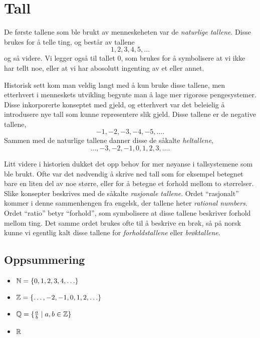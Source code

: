 

\section{Tall}

De første tallene som ble brukt av menneskeheten var de \emph{naturlige tallene}. 
Disse brukes for å telle ting, og består av tallene 
$$1, 2, 3, 4, 5, \ldots$$
og så videre.
Vi legger også til tallet $0$, som brukes for å symbolisere at vi ikke har tellt noe, eller at vi har abosolutt ingenting av et eller annet. 

Historisk sett kom man veldig langt med å kun bruke disse tallene, men etterhvert i menneskets utvikling begynte man å lage mer rigorøse pengesystemer. 
Disse inkorporerte konseptet med gjeld, og etterhvert var det beleielig å introdusere nye tall som kunne representere slik gjeld. 
Disse tallene er de negative tallene, 
$$-1, -2, -3, -4, -5, \ldots.$$
Sammen med de naturlige tallene danner disse de såkalte \emph{heltallene}, 
$$\ldots, -3, -2, -1, 0, 1, 2, 3, \ldots . $$

Litt videre i historien dukket det opp behov for mer nøyanse i tallsystemene som ble brukt. 
Ofte var det nødvendig å skrive ned tall som for eksempel betegnet bare en liten del av noe større, eller for å betegne et forhold mellom to størrelser. 
Slike konsepter beskrives med de såkalte \emph{rasjonale tallene}. 
Ordet ``rasjonalt'' kommer i denne sammenhengen fra engelsk, der tallene heter \emph{rational numbers}. 
Ordet ``ratio'' betyr ``forhold'', som symbolisere at disse tallene beskriver forhold mellom ting. 
Det samme ordet brukes ofte til å beskrive en brøk, så på norsk kunne vi egentlig kalt disse tallene for \emph{forholdstallene} eller \emph{brøktallene}.





\subsection{Oppsummering}
\begin{itemize}
    \item $\mathbb{N} = \{0,1,2,3,4,\ldots \}$
    \item $\mathbb{Z} = \{\ldots, -2, -1, 0, 1, 2, \ldots\}$ 
    \item $\mathbb{Q} = \{\frac{a}{b} \mid a, b \in \mathbb{Z}\}$
    \item $\mathbb{R}$
\end{itemize}